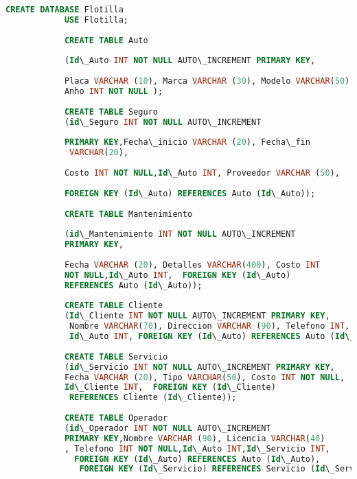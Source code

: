 \documentclass{article}
\begin{document}
        \begin{lstlisting}[language=SQL, caption=Crear base de datos competencia.]        
            CREATE DATABASE Flotilla
            USE Flotilla;
            
            CREATE TABLE Auto 
            
            (Id\_Auto INT NOT NULL AUTO\_INCREMENT PRIMARY KEY, 
            
            Placa VARCHAR (10), Marca VARCHAR (30), Modelo VARCHAR(50), 
            Anho INT NOT NULL );
            
            CREATE TABLE Seguro 
            (id\_Seguro INT NOT NULL AUTO\_INCREMENT 
            
            PRIMARY KEY,Fecha\_inicio VARCHAR (20), Fecha\_fin
             VARCHAR(20), 
            
            Costo INT NOT NULL,Id\_Auto INT, Proveedor VARCHAR (50),  
            
            FOREIGN KEY (Id\_Auto) REFERENCES Auto (Id\_Auto));
            
            CREATE TABLE Mantenimiento 
            
            (id\_Mantenimiento INT NOT NULL AUTO\_INCREMENT 
            PRIMARY KEY,
            
            Fecha VARCHAR (20), Detalles VARCHAR(400), Costo INT 
            NOT NULL,Id\_Auto INT,  FOREIGN KEY (Id\_Auto) 
            REFERENCES Auto (Id\_Auto));
            
            CREATE TABLE Cliente
            (Id\_Cliente INT NOT NULL AUTO\_INCREMENT PRIMARY KEY,
             Nombre VARCHAR(70), Direccion VARCHAR (90), Telefono INT, 
             Id\_Auto INT, FOREIGN KEY (Id\_Auto) REFERENCES Auto (Id\_Auto));
            
            CREATE TABLE Servicio 
            (id\_Servicio INT NOT NULL AUTO\_INCREMENT PRIMARY KEY,
            Fecha VARCHAR (20), Tipo VARCHAR(50), Costo INT NOT NULL,
            Id\_Cliente INT,  FOREIGN KEY (Id\_Cliente)
             REFERENCES Cliente (Id\_Cliente));
            
            CREATE TABLE Operador 
            (id\_Operador INT NOT NULL AUTO\_INCREMENT 
            PRIMARY KEY,Nombre VARCHAR (90), Licencia VARCHAR(40)
            , Telefono INT NOT NULL,Id\_Auto INT,Id\_Servicio INT,
              FOREIGN KEY (Id\_Auto) REFERENCES Auto (Id\_Auto),
               FOREIGN KEY (Id\_Servicio) REFERENCES Servicio (Id\_Servicio));
               

\end{lstlisting}
\end{document}
